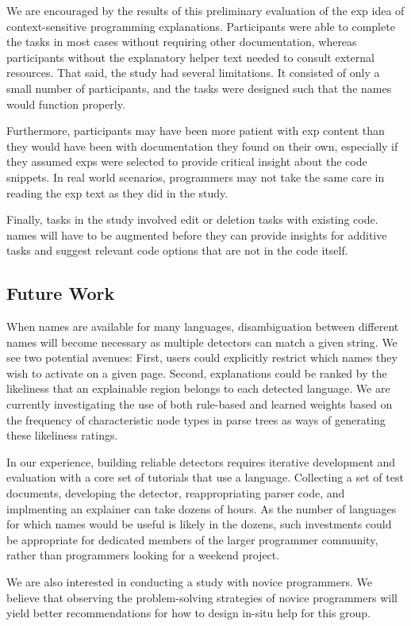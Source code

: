 We are encouraged by the results of this preliminary evaluation of the \gls{exp} idea of context-sensitive programming explanations.
Participants were able to complete the tasks in most cases without requiring other documentation, whereas participants without the explanatory helper text needed to consult external resources.
That said, the study had several limitations.  It consisted of only a small number of participants, and the tasks were designed such that the \Glspl{name} would function properly. 

Furthermore, participants may have been more patient with \gls{exp} content than they would have been with documentation they found on their own, especially if they assumed \glspl{exp} were selected to provide critical insight about the code snippets.
In real world scenarios, programmers may not take the same care in reading the \gls{exp} text as they did in the study.

Finally, tasks in the study involved edit or deletion tasks with existing code.
\Glspl{name} will have to be augmented before they can provide insights for additive tasks and suggest relevant code options that are not in the code itself.

\subsection{Future Work}

\begin{changes}
    When \Glspl{name} are available for many languages, disambiguation between different \Glspl{name} will become necessary as multiple detectors can match a given string.
We see two potential avenues: First, users could explicitly restrict which \Glspl{name} they wish to activate on a given page.
Second, explanations could be ranked by the likeliness that an explainable region belongs to each detected language.
We are currently investigating the use of both rule-based and learned weights based on the frequency of characteristic node types in parse trees as ways of generating these likeliness ratings.
\end{changes}

\begin{changes}
In our experience, building reliable detectors requires iterative development and evaluation with a core set of tutorials that use a language.
Collecting a set of test documents, developing the detector, reappropriating parser code, and implmenting an explainer can take dozens of hours.
As the number of languages for which \Glspl{name} would be useful is likely in the dozens, such investments could be appropriate for dedicated members of the larger programmer community, rather than programmers looking for a weekend project.
\end{changes}
\fi

We are also interested in conducting a study with novice programmers.
We believe that observing the problem-solving strategies of novice programmers will yield better recommendations for how to design in-situ help for this group.
